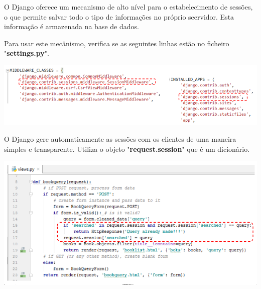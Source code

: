 \documentclass{article}
\begin{document}
\begin{flushleft}
  O Django oferece um mecanismo de alto nível para o estabelecimento de sessões,
  o que permite salvar todo o tipo de informações no próprio seervidor. Esta informação
  é armazenada na base de dados.

  \vspace{2mm}

  Para usar este mecânismo, verifica se as seguintes linhas estão no ficheiro
  "\textbf{settings.py}".

  \begin{center}
    \includegraphics[scale=0.35]{27}
  \end{center}

  O Django gere automaticamente as sessões com os clientes de uma maneira
  simples e transparente. Utiliza o objeto "\textbf{request.session}" que
  é um dicionário.

  \begin{center}
    \includegraphics[scale=0.35]{28}
  \end{center}
\end{flushleft}
\end{document}
